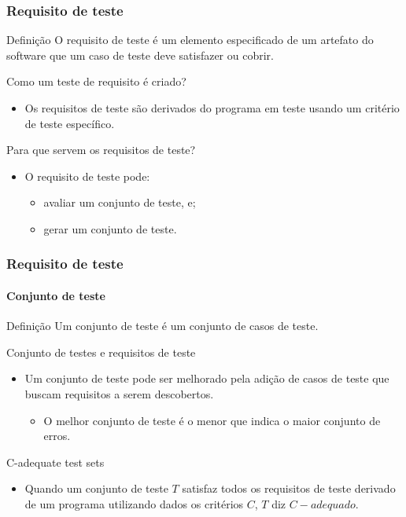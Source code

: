 \begin{frame}[parent={cmap:software-testing-foundations}, hasprev=false, hasnext=true]
\frametitle{Requisito de teste}
\label{concept:test-requirement}

\begin{block:concept}{Definição}
O requisito de teste é um elemento especificado de um artefato do software que um caso de teste deve satisfazer ou cobrir.
\end{block:concept}

\begin{block:fact}{Como um teste de requisito é criado?}
\begin{itemize}
	\item Os requisitos de teste são derivados do programa em teste usando um critério de teste específico.
\end{itemize}
\end{block:fact}

\begin{block:fact}{Para que servem os requisitos de teste?}
\begin{itemize}
	\item O requisito de teste pode:
	\begin{itemize}
		\item avaliar um conjunto de teste, e;
		\item gerar um conjunto de teste.
	\end{itemize}
\end{itemize}
\end{block:fact}
\end{frame}


\begin{frame}[hasprev=true, hasnext=false]
\label{concept:test-set}
\label{concept:c-adequate-test-set}
\frametitle{Requisito de teste}
\framesubtitle{Conjunto de teste}

\begin{block:concept}{Definição}
Um conjunto de teste é um conjunto de casos de teste.
\end{block:concept}

\begin{block:fact}{Conjunto de testes e requisitos de teste}
\begin{itemize}
	\item Um conjunto de teste pode ser melhorado pela adição de casos de teste que buscam requisitos a serem descobertos.
	\begin{itemize}
		\item O melhor conjunto de teste é o menor que indica o maior conjunto de erros.
	\end{itemize}
\end{itemize}
\end{block:fact}

\begin{block:concept}{C-adequate test sets}
\begin{itemize}
	\item Quando um conjunto de teste $T$ satisfaz todos os requisitos de teste derivado de um programa utilizando dados os critérios $C$, $T$ diz $C-adequado$.
\end{itemize}
\end{block:concept}
\end{frame}